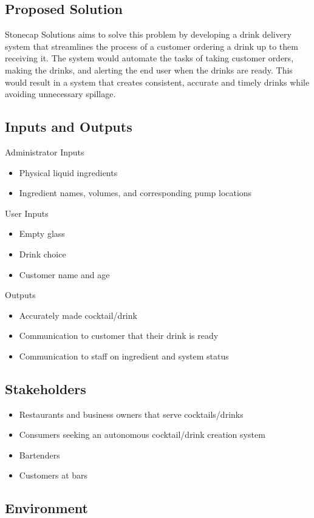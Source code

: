 \documentclass{article}
\begin{document}
\subsection{Proposed Solution}
Stonecap Solutions aims to solve this problem by developing a drink delivery system that streamlines the process of a customer ordering a drink up to them receiving it. The system would automate the tasks of taking customer orders, making the drinks, and alerting the end user when the drinks are ready. This would result in a system that creates consistent, accurate and timely drinks while avoiding unnecessary spillage.

\subsection{Inputs and Outputs}
Administrator Inputs
\begin{itemize}
\item Physical liquid ingredients
\item Ingredient names, volumes, and corresponding pump locations
\end{itemize}
User Inputs
\begin{itemize}
\item Empty glass
\item Drink choice
\item Customer name and age
\end{itemize}
Outputs
\begin{itemize}
    \item Accurately made cocktail/drink
    \item Communication to customer that their drink is ready 
    \item Communication to staff on ingredient and system status
\end{itemize}
\subsection{Stakeholders}
\begin{itemize}
    \item Restaurants and business owners that serve cocktails/drinks
    \item Consumers seeking an autonomous cocktail/drink creation system
    \item Bartenders
    \item Customers at bars
\end{itemize}

\subsection{Environment}
\end{document}
